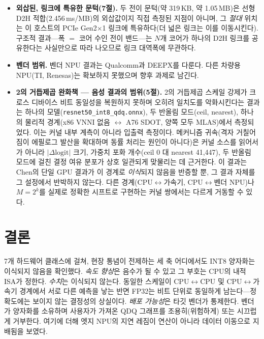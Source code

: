 \documentclass[11pt]{article}
\begin{document}
\begin{itemize}
\item \textbf{외삽된, 링크에 특유한 문턱(7절).} 두 전이 문턱(약 319\,KB, 약 1.05\,MB)은 선형 D2H 적합(2.456\,ms/MB)의 외삽값이지 직접 측정된 지점이 아니며, 그 \emph{절대} 위치는 이 호스트의 PCIe Gen2$\times$1 링크에 특유하다(더 넓은 링크는 이를 이동시킨다). 구조적 결과---폭 $=$ 코어 수인 전이 밴드---는 $N$개 코어가 하나의 D2H 링크를 공유한다는 사실만으로 따라 나오므로 링크 대역폭에 무관하다.
\item \textbf{벤더 범위.} 벤더 NPU 결과는 Qualcomm과 DEEPX를 다룬다. 다른 차량용 NPU(TI, Renesas)는 확보하지 못했으며 향후 과제로 남긴다.
\item \textbf{2의 거듭제곱 완화책 --- 음성 결과의 범위(5절).} 2의 거듭제곱 스케일 강제가 크로스 디바이스 비트 동일성을 복원하지 못하며 오히려 일치도를 악화시킨다는 결과는 하나의 모델(\texttt{resnet50\_int8\_qdq.onnx}), 두 반올림 모드(ceil, nearest), 하나의 물리적 경계(x86 VNNI 없음 $\leftrightarrow$ A76 SDOT, 양쪽 모두 MLAS)에서 측정되었다. 이는 커널 내부 계측이 아니라 입출력 측정이다. 메커니즘 귀속(격자 거칠어짐이 에필로그 발산을 확대하며 동률 처리는 원인이 아니다)은 커널 소스를 읽어서가 아니라 $|\Delta\mathrm{logit}|$ 크기, 가중치 포화 개수(ceil 0 대 nearest 41{,}447), 두 반올림 모드에 걸친 결정 여유 분포가 상호 일관되게 맞물리는 데 근거한다. 이 결과는 Chen의 단일 GPU 결과가 이 경계로 \emph{이식}되지 않음을 반증할 뿐, 그 결과 자체를 그 설정에서 반박하지 않는다. 다른 경계(CPU$\leftrightarrow$가속기, CPU$\leftrightarrow$벤더 NPU)나 $M=2^k$를 실제로 정확한 시프트로 구현하는 커널 쌍에서는 다르게 거동할 수 있다.
\end{itemize}

\section{결론}

7개 하드웨어 클래스에 걸쳐, 현장 통념이 전제하는 세 축 어디에서도 INT8 양자화는 이식되지 않음을 확인했다. \emph{속도 향상}은 음수가 될 수 있고 그 부호는 CPU의 내적 ISA가 정한다. \emph{수치}는 이식되지 않는다. 동일한 스케일이 CPU$\leftrightarrow$CPU 및 CPU$\leftrightarrow$가속기 경계에서 서로 다른 예측을 낳는 반면 FP32는 비트 단위로 동일하게 남는다---정확도에는 보이지 않는 결정성의 상실이다. \emph{배포 가능성}은 타깃 벤더가 통제한다. 벤더가 양자화를 소유하며 사용자가 가져온 QDQ 그래프를 조용히(위험하게) 또는 시끄럽게 거부한다. 여기에 더해 엣지 NPU의 지연 레짐이 연산이 아니라 데이터 이동으로 지배됨을 보였다.
\end{document}
